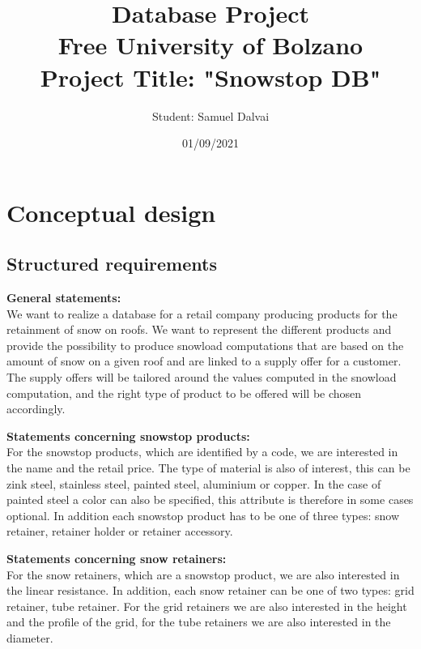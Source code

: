 \documentclass{article}[h]
\title{\huge Database Project\\
    Free University of Bolzano\\
    \vspace{6px}
    \huge \textbf {Project Title: "Snowstop DB"}}
\author{Student: Samuel Dalvai}
\date{01/09/2021}
\begin{document}
\maketitle

\tableofcontents


\section{Conceptual design}

\subsection{Structured requirements}

\setlength{\parindent}{0cm}
\vspace{12px}
\textbf{General statements:\\}
We want to realize a database for a retail company producing products for the retainment of snow on roofs. We want to represent the different products and provide the possibility to produce snowload computations that are based on the amount of snow on a given roof and are linked to a supply offer for a customer. The supply offers will be tailored around the values computed in the snowload computation, and the right type of product to be offered will be chosen accordingly.

\vspace{12px}
\textbf{Statements concerning snowstop products:\\}
For the snowstop products, which are identified by a code, we are interested in the name and the retail price. The type of material is also of interest, this can be zink steel, stainless steel, painted steel, aluminium or copper. In the case of painted steel a color can also be specified, this attribute is therefore in some cases optional. In addition each snowstop product has to be one of three types: snow retainer, retainer holder or retainer accessory.

\vspace{12px}
\textbf{Statements concerning snow retainers:\\}
For the snow retainers, which are a snowstop product, we are also interested in the linear resistance. In addition, each snow retainer can be one of two types: grid retainer, tube retainer.
For the grid retainers we are also interested in the height and the profile of the grid, for the tube retainers we are also interested in the diameter.
\end{document}
